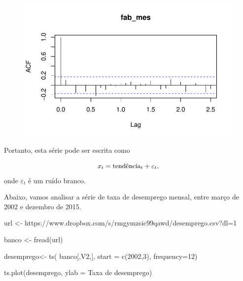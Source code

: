 \documentclass[
  letterpaper,
  DIV=11,
  numbers=noendperiod]{scrreprt}
\newenvironment{Shaded}{\begin{snugshade}}{\end{snugshade}}
\newcommand{\AttributeTok}[1]{\textcolor[rgb]{0.40,0.45,0.13}{#1}}
\newcommand{\DecValTok}[1]{\textcolor[rgb]{0.68,0.00,0.00}{#1}}
\newcommand{\FunctionTok}[1]{\textcolor[rgb]{0.28,0.35,0.67}{#1}}
\newcommand{\NormalTok}[1]{\textcolor[rgb]{0.00,0.23,0.31}{#1}}
\newcommand{\OtherTok}[1]{\textcolor[rgb]{0.00,0.23,0.31}{#1}}
\newcommand{\StringTok}[1]{\textcolor[rgb]{0.13,0.47,0.30}{#1}}
\begin{document}
\begin{figure}[H]

{\centering \includegraphics{ferramentas_files/figure-pdf/unnamed-chunk-4-2.pdf}

}

\end{figure}

Portanto, esta série pode ser escrita como

\[x_t = \hbox{tendência}_t+\varepsilon_t,\] onde \(\varepsilon_t\) é um
ruído branco.

Abaixo, vamos analisar a série de taxa de desemprego mensal, entre março
de 2002 e dezembro de 2015.

\begin{Shaded}
\begin{Highlighting}[]
\NormalTok{url }\OtherTok{\textless{}{-}} \StringTok{\textquotesingle{}https://www.dropbox.com/s/rmgymzsic99qawd/desemprego.csv?dl=1\textquotesingle{}}

\NormalTok{banco }\OtherTok{\textless{}{-}} \FunctionTok{fread}\NormalTok{(url)}

\NormalTok{desemprego}\OtherTok{\textless{}{-}} \FunctionTok{ts}\NormalTok{( banco[,}\StringTok{\textquotesingle{}V2\textquotesingle{}}\NormalTok{,], }\AttributeTok{start =} \FunctionTok{c}\NormalTok{(}\DecValTok{2002}\NormalTok{,}\DecValTok{3}\NormalTok{), }\AttributeTok{frequency=}\DecValTok{12}\NormalTok{)}

\FunctionTok{ts.plot}\NormalTok{(desemprego, }\AttributeTok{ylab =} \StringTok{\textquotesingle{}Taxa de desemprego\textquotesingle{}}\NormalTok{)}
\end{Highlighting}
\end{Shaded}
\end{document}

